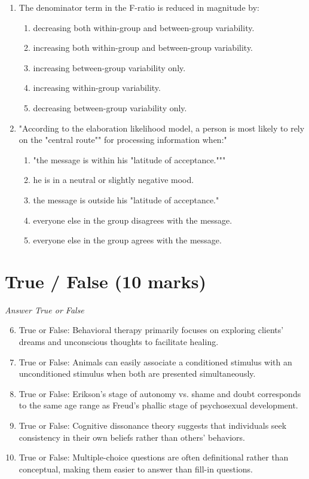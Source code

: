 \documentclass[12pt]{article}
\begin{document}
\begin{enumerate}[label=\arabic*.]
\begin{enumerate}[label=(\alph*)]
    \item High arousal always maximizes motivation.
\end{enumerate}
\item The denominator term in the F-ratio is reduced in magnitude by:
\begin{enumerate}[label=(\alph*)]
    \item decreasing both within-group and between-group variability.
    \item increasing both within-group and between-group variability.
    \item increasing between-group variability only.
    \item increasing within-group variability.
    \item decreasing between-group variability only.
\end{enumerate}
\item "According to the elaboration likelihood model, a person is most likely to rely on the "central route"" for processing information when:"
\begin{enumerate}[label=(\alph*)]
    \item "the message is within his "latitude of acceptance."""
    \item he is in a neutral or slightly negative mood.
    \item the message is outside his "latitude of acceptance."
    \item everyone else in the group disagrees with the message.
    \item everyone else in the group agrees with the message.
\end{enumerate}
\end{enumerate}

\section*{True / False (10 marks)}
\textit{Answer True or False}
\begin{enumerate}[label=\arabic*.]
\setcounter{enumi}{5}
\item True or False: Behavioral therapy primarily focuses on exploring clients' dreams and unconscious thoughts to facilitate healing.
\item True or False: Animals can easily associate a conditioned stimulus with an unconditioned stimulus when both are presented simultaneously.
\item True or False: Erikson's stage of autonomy vs. shame and doubt corresponds to the same age range as Freud's phallic stage of psychosexual development.
\item True or False: Cognitive dissonance theory suggests that individuals seek consistency in their own beliefs rather than others' behaviors.
\item True or False: Multiple-choice questions are often definitional rather than conceptual, making them easier to answer than fill-in questions.
\end{enumerate}
\end{document}
